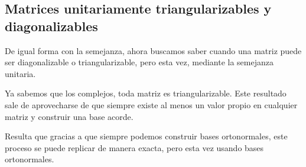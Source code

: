 \subsection{Matrices unitariamente triangularizables y diagonalizables}

De igual forma con la semejanza, ahora buscamos saber cuando una matriz puede ser diagonalizable o triangularizable, pero esta vez, mediante la semejanza unitaria. 

Ya sabemos que los complejos, toda matriz es triangularizable. Este resultado sale de aprovecharse de que siempre existe al menos un valor propio en cualquier matriz y construir una base acorde.

Resulta que gracias a que siempre podemos construir bases ortonormales, este proceso se puede replicar de manera exacta, pero esta vez usando bases ortonormales.

